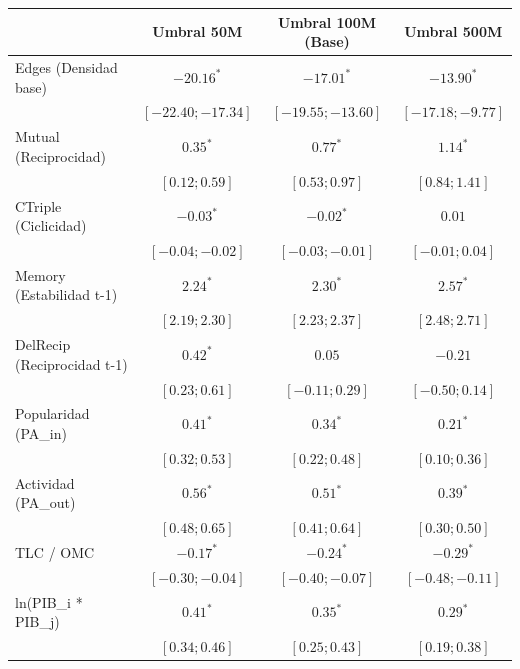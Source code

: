 
\begin{table}
\begin{center}
\begin{tabular}{l c c c}
\hline
 & Umbral 50M & Umbral 100M (Base) & Umbral 500M \\
\hline
Edges (Densidad base)       & $-20.16^{*}$        & $-17.01^{*}$        & $-13.90^{*}$       \\
                            & $ [-22.40; -17.34]$ & $ [-19.55; -13.60]$ & $ [-17.18; -9.77]$ \\
Mutual (Reciprocidad)       & $0.35^{*}$          & $0.77^{*}$          & $1.14^{*}$         \\
                            & $ [  0.12;   0.59]$ & $ [  0.53;   0.97]$ & $ [  0.84;  1.41]$ \\
CTriple (Ciclicidad)        & $-0.03^{*}$         & $-0.02^{*}$         & $0.01$             \\
                            & $ [ -0.04;  -0.02]$ & $ [ -0.03;  -0.01]$ & $ [ -0.01;  0.04]$ \\
Memory (Estabilidad t-1)    & $2.24^{*}$          & $2.30^{*}$          & $2.57^{*}$         \\
                            & $ [  2.19;   2.30]$ & $ [  2.23;   2.37]$ & $ [  2.48;  2.71]$ \\
DelRecip (Reciprocidad t-1) & $0.42^{*}$          & $0.05$              & $-0.21$            \\
                            & $ [  0.23;   0.61]$ & $ [ -0.11;   0.29]$ & $ [ -0.50;  0.14]$ \\
Popularidad (PA\_in)        & $0.41^{*}$          & $0.34^{*}$          & $0.21^{*}$         \\
                            & $ [  0.32;   0.53]$ & $ [  0.22;   0.48]$ & $ [  0.10;  0.36]$ \\
Actividad (PA\_out)         & $0.56^{*}$          & $0.51^{*}$          & $0.39^{*}$         \\
                            & $ [  0.48;   0.65]$ & $ [  0.41;   0.64]$ & $ [  0.30;  0.50]$ \\
TLC / OMC                   & $-0.17^{*}$         & $-0.24^{*}$         & $-0.29^{*}$        \\
                            & $ [ -0.30;  -0.04]$ & $ [ -0.40;  -0.07]$ & $ [ -0.48; -0.11]$ \\
ln(PIB\_i * PIB\_j)         & $0.41^{*}$          & $0.35^{*}$          & $0.29^{*}$         \\
                            & $ [  0.34;   0.46]$ & $ [  0.25;   0.43]$ & $ [  0.19;  0.38]$ \\

\end{tabular}
\end{center}
\end{table}
